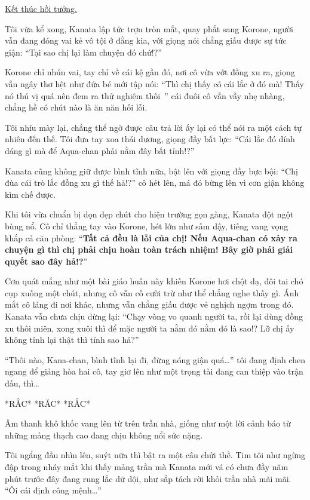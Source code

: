 \documentclass[../main.tex]{subfiles}
\begin{document}
\begin{center}
  \uline{Kết thúc hồi tưởng.}
\end{center}

Tôi vừa kể xong, Kanata lập tức trợn tròn mắt, quay phắt sang Korone, người vẫn đang đóng vai kẻ vô tội ở đằng kia, với giọng nói chẳng giấu được sự tức giận: ``Tại sao chị lại làm chuyện đó chứ!?''

Korone chỉ nhún vai, tay chỉ về cái kệ gần đó, nơi cô vừa vớt đồng xu ra, giọng vẫn ngây thơ hệt như đứa bé mới tập nói: ``Thì chị thấy có cái lắc ở đó mà! Thấy nó thú vị quá nên đem ra thử nghiệm thôi~{}'' cái đuôi cô vẫn vẫy nhẹ nhàng, chẳng hề có chút nào là ăn năn hối lỗi.

Tôi nhíu mày lại, chẳng thể ngờ được câu trả lời ấy lại có thể nói ra một cách tự nhiên đến thế. Tôi đưa tay xoa thái dương, giọng đầy bất lực: ``Cái lắc đó dính dáng gì mà để Aqua-chan phải nằm đây bất tỉnh!?''

Kanata cũng không giữ được bình tĩnh nữa, bật lên với giọng đầy bực bội: ``Chị đùa cái trò lắc đồng xu gì thế hả!?'' cô hét lên, má đỏ bừng lên vì cơn giận không kìm chế được.

Khi tôi vừa chuẩn bị dọn dẹp chút cho hiện trường gọn gàng, Kanata đột ngột bùng nổ. Cô chỉ thẳng tay vào Korone, hét lớn như sấm dậy, tiếng vang vọng khắp cả căn phòng: ``\textbf{Tất cả đều là lỗi của chị! Nếu Aqua-chan có xảy ra chuyện gì thì chị phải chịu hoàn toàn trách nhiệm! Bây giờ phải giải quyết sao đây hả!?}''

Cơn quát mắng như một bài giáo huấn này khiến Korone hơi chột dạ, đôi tai chó cụp xuống một chút, nhưng cô vẫn cố cười trừ như thể chẳng nghe thấy gì. Ánh mắt cô lảng đi nơi khác, nhưng vẫn chẳng giấu được vẻ nghịch ngợm trong đó. Kanata vẫn chưa chịu dừng lại: ``Chạy vòng vo quanh người ta, rồi lại dùng đồng xu thôi miên, xong xuôi thì để mặc người ta nằm đó nằm đó là sao!? Lỡ chị ấy không tỉnh lại thật thì tính sao hả?''

``Thôi nào, Kana-chan, bình tĩnh lại đi, đừng nóng giận quá\dots'' tôi đang định chen ngang để giảng hòa hai cô, tay giơ lên như một trọng tài đang can thiệp vào trận đấu, thì\dots

*RẮC* *RĂC* *RẮC*

Âm thanh khô khốc vang lên từ trên trần nhà, giống như một lời cảnh báo từ những mảng thạch cao đang chịu không nổi sức nặng.

Tôi ngẩng đầu nhìn lên, suýt nữa thì bật ra một câu chửi thề. Tim tôi như ngừng đập trong nháy mắt khi thấy mảng trần mà Kanata mới vá có chưa đầy năm phút trước đây đang rung lắc dữ dội, như sắp tách rời khỏi trần nhà mãi mãi. ``Ôi cái định công mệnh\dots''
\end{document}
